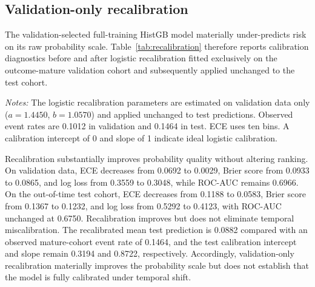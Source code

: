 \documentclass[10pt]{article}
\begin{document}
\subsection{Validation-only recalibration}

\label{sec:recalibration}

The validation-selected full-training HistGB model materially under-predicts risk on its raw probability scale. Table~\ref{tab:recalibration} therefore reports calibration diagnostics before and after logistic recalibration fitted exclusively on the outcome-mature validation cohort and subsequently applied unchanged to the test cohort.

\begin{table}[!ht]
\centering
\caption{Calibration diagnostics before and after validation-only logistic recalibration of the selected HistGB estimator.}
\label{tab:recalibration}

\vspace{3pt}
{\footnotesize \textit{Notes:} The logistic recalibration parameters are estimated on validation data only ($a=1.4450$, $b=1.0570$) and applied unchanged to test predictions. Observed event rates are 0.1012 in validation and 0.1464 in test. ECE uses ten bins. A calibration intercept of 0 and slope of 1 indicate ideal logistic calibration.}
\end{table}

Recalibration substantially improves probability quality without altering ranking. On validation data, ECE decreases from 0.0692 to 0.0029, Brier score from 0.0933 to 0.0865, and log loss from 0.3559 to 0.3048, while ROC-AUC remains 0.6966. On the out-of-time test cohort, ECE decreases from 0.1188 to 0.0583, Brier score from 0.1367 to 0.1232, and log loss from 0.5292 to 0.4123, with ROC-AUC unchanged at 0.6750. Recalibration improves but does not eliminate temporal miscalibration. The recalibrated mean test prediction is 0.0882 compared with an observed mature-cohort event rate of 0.1464, and the test calibration intercept and slope remain 0.3194 and 0.8722, respectively. Accordingly, validation-only recalibration materially improves the probability scale but does not establish that the model is fully calibrated under temporal shift.
\end{document}
